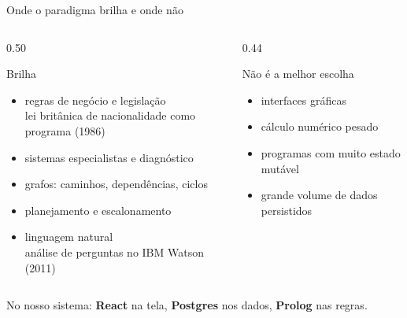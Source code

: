 \documentclass[aspectratio=169,11pt,xcolor=table]{beamer}
\newcommand{\destaque}[1]{%
  \begin{center}\colorbox{accent!10}{\parbox{0.92\linewidth}{\centering\strut #1\strut}}\end{center}}
\begin{document}
\begin{frame}{Onde o paradigma brilha e onde não}
  \begin{columns}[T]
    \begin{column}{0.50\textwidth}
      \begin{alertblock}{Brilha}
        \small
        \begin{itemize}
          \item regras de negócio e legislação\\
                {\scriptsize\color{muted} lei britânica de nacionalidade como programa (1986)}
          \item sistemas especialistas e diagnóstico
          \item grafos: caminhos, dependências, ciclos
          \item planejamento e escalonamento
          \item linguagem natural\\
                {\scriptsize\color{muted} análise de perguntas no IBM Watson (2011)}
        \end{itemize}
      \end{alertblock}
    \end{column}
    \begin{column}{0.44\textwidth}
      \begin{block}{Não é a melhor escolha}
        \small
        \begin{itemize}
          \item interfaces gráficas
          \item cálculo numérico pesado
          \item programas com muito estado mutável
          \item grande volume de dados persistidos
        \end{itemize}
      \end{block}
    \end{column}
  \end{columns}
  \vspace{8pt}
  \destaque{\small No nosso sistema: \textbf{React} na tela, \textbf{Postgres} nos
  dados, \textbf{Prolog} nas regras.}
\end{frame}
\end{document}
